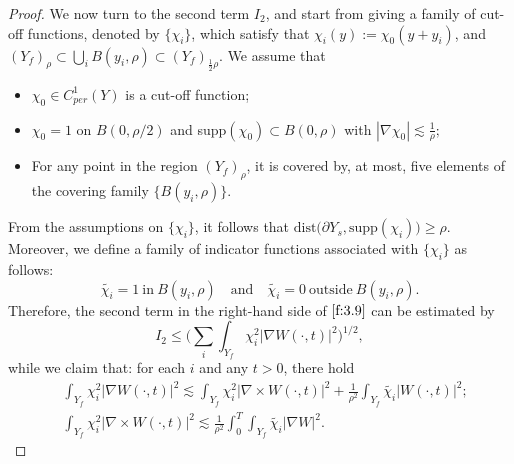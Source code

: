 \documentclass[13pt,CJK]{article}
\theoremstyle{plain}                       %
\theoremstyle{remark}
\numberwithin{equation}{section}
\begin{document}
\begin{proof}
We now turn to the second term $I_2$, and start from giving
a family of cut-off functions, denoted by $\{\chi_i\}$, which
satisfy that
$\chi_{i}(y):=\chi_0(y+y_i)$, and $(Y_f)_{\rho}\subset\bigcup_{i}B(y_i,\rho)\subset
(Y_f)_{\frac{1}{2}\rho}$.
We assume that
\begin{itemize}
  \item $\chi_0\in C_{per}^1(Y)$ is a cut-off function;
  \item $\chi_0=1$ on $B(0,\rho/2)$ and supp$(\chi_0)\subset B(0,\rho)$  with $|\nabla\chi_0|\lesssim \frac{1}{\rho};$
  \item For any point in the region $(Y_f)_\rho$, it is covered by, at most, five elements of the covering family $\{B(y_i,\rho)\}$.
\end{itemize}
From the assumptions on $\{\chi_i\}$, it follows that  $\text{dist}\big(\partial Y_s,\text{supp}(\chi_i)\big)\geq \rho$.
Moreover, we define a family of indicator functions associated with
$\{\chi_i\}$ as follows:
\begin{equation*}
\tilde{\chi_i}=1 ~\text{in}~ B(y_i,\rho) \quad \text{and}\quad \tilde{\chi_i}=0 ~\text{outside}~ B(y_i,\rho).
\end{equation*}
Therefore, the second term in the right-hand side of $\eqref{f:3.9}$
can be estimated by
\begin{equation*}
I_2\leq \bigg(\sum_{i}\int_{Y_f}\chi_i^2|\nabla W(\cdot,t)|^2\bigg)^{1/2},
\end{equation*}
while we claim that: for each $i$ and any $t>0$, there hold
\begin{subequations}
\begin{align}
&\int_{Y_f}\chi_i^2|\nabla W(\cdot,t)|^2 \lesssim \int_{Y_f}\chi_i^2|\nabla\times W(\cdot,t)|^2+\frac{1}{\rho^2}\int_{Y_f}
  \tilde{\chi_i}|W(\cdot,t)|^2; \label{f:3.10a}\\
&\int_{Y_f}\chi_i^2|\nabla\times W(\cdot,t)|^2 \lesssim
\frac{1}{\rho^2}\int_{0}^{T}\int_{Y_f}
\tilde{\chi_i}|\nabla W|^2.
\label{f:3.10b}
\end{align}
\end{subequations}



\end{proof}
\end{document}
